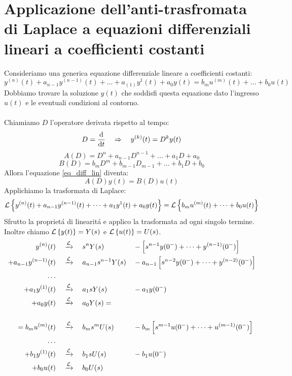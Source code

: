 \documentclass[../main.tex]{subfiles}
\begin{document}
	\section{Applicazione dell'anti-trasfromata di Laplace a equazioni differenziali lineari a coefficienti costanti}
	Consideriamo una generica equazione differenziale lineare a coefficienti costanti:
	\begin{equation} \label{eq_diff_lin}
		y^{(n)}(t) + a_{n-1}y^{(n-1)}(t) + \dots + a_{(1)}y^{1}(t) + a_{0}y(t) = b_{m}u^{(m)}(t) + \dots + b_0 u(t)
	\end{equation}
	Dobbiamo trovare la soluzione $ y(t) $ che soddisfi questa equazione dato l'ingresso $ u(t) $ e le eventuali condizioni al contorno.\\
	\medskip\\
	Chiamiamo $ D $ l'operatore derivata rispetto al tempo:
	\[ D = \frac{\mathrm{d} }{\mathrm{d} t} \quad \Rightarrow \quad y^{(k)}(t) = D^k y(t) \]
	\[ A(D) = D^n + a_{n-1} D^{n-1} + \dots + a_1 D + a_0 \]
	\[ B(D) = b_m D^m + b_{m-1} D_{m-1} + \dots + b_1 D + b_0 \]
	Allora l'equazione \ref{eq_diff_lin} diventa:
	\[ A(D) y(t) = B(D) u(t) \]
	Applichiamo la trasformata di Laplace:
	\[ \mathcal{L} \left\lbrace y^{(n)}(t) + a_{n-1}y^{(n-1)}(t) + \dots + a_{1}y^{1}(t) + a_{0}y(t) \right\rbrace = \mathcal{L} \left\lbrace b_{m}u^{(m)}(t) + \dots + b_0 u(t) \right\rbrace \]
	Sfrutto la propriet\'{a} di linearit\'{a} e applico la trasformata ad ogni singolo termine.\\
	Inoltre chiamo $ \mathcal{L} \left\lbrace y(t) \right\rbrace = Y(s) $ e $ \mathcal{L} \left\lbrace u(t) \right\rbrace = U(s) $.
	\allowdisplaybreaks
	\begin{align*}
		\Lapl{y^{(n)}(t)&}{s^n Y(s) &&- \left[ s^{n-1} y(0^-) + \dots + y^{(n-1)}(0^-) \right] }\\
		\Lapl{+ a_{n-1}y^{(n-1)}(t)&}{a_{n-1} s^{n-1} Y(s) &&- a_{n-1} \left[ s^{n-2} y(0^-) + \dots + y^{(n-2)}(0^-) \right] }\\
		\smallskip\dots\smallskip\\
		\Lapl{+ a_{1}y^{(1)}(t)&}{a_{1} s Y(s) &&- a_{1} y(0^-) }\\
		\Lapl{+ a_{0}y(t)&}{a_{0} Y(s) } = \\\medskip\\
		\Lapl{ = b_m u^{(m)}(t)& }{b_m s^m U(s) &&- b_m \left[ s^{m-1} u(0^-) + \dots + u^{(m-1)}(0^-) \right] }\\
		\smallskip\dots\smallskip\\
		\Lapl{+ b_{1}y^{(1)}(t)&}{b_{1} s U(s) &&- b_{1} u(0^-) }\\
		\Lapl{+ b_{0}u(t)&}{b_{0} U(s) }
	\end{align*}
\end{document}

